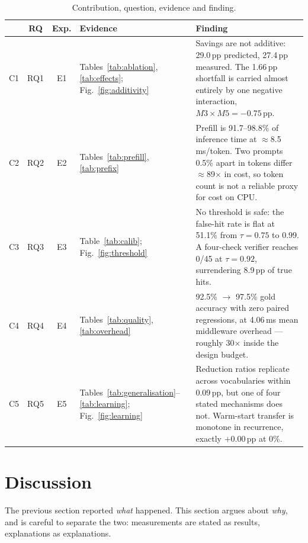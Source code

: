 \documentclass[11pt,a4paper]{article}
\begin{document}
\begin{table}[htbp]
\centering
\caption{Contribution, question, evidence and finding.}
\label{tab:summary}
\scriptsize
\begin{tabularx}{\textwidth}{@{}l c c L{2.6cm} X@{}}
\toprule
& \textbf{RQ} & \textbf{Exp.} & \textbf{Evidence} & \textbf{Finding} \\
\midrule
C1 & RQ1 & E1 & Tables~\ref{tab:ablation}, \ref{tab:effects}; Fig.~\ref{fig:additivity} &
  Savings are not additive: 29.0\,pp predicted, 27.4\,pp measured. The 1.66\,pp shortfall is carried almost entirely by one negative interaction, $M3\times M5 = -0.75$\,pp. \\
\addlinespace
C2 & RQ2 & E2 & Tables~\ref{tab:prefill}, \ref{tab:prefix} &
  Prefill is 91.7--98.8\% of inference time at $\approx$8.5\,ms/token. Two prompts 0.5\% apart in tokens differ $\approx$89$\times$ in cost, so token count is not a reliable proxy for cost on CPU. \\
\addlinespace
C3 & RQ3 & E3 & Table~\ref{tab:calib}; Fig.~\ref{fig:threshold} &
  No threshold is safe: the false-hit rate is flat at 51.1\% from $\tau=0.75$ to $0.99$. A four-check verifier reaches 0/45 at $\tau=0.92$, surrendering 8.9\,pp of true hits. \\
\addlinespace
C4 & RQ4 & E4 & Tables~\ref{tab:quality}, \ref{tab:overhead} &
  92.5\% $\rightarrow$ 97.5\% gold accuracy with zero paired regressions, at 4.06\,ms mean middleware overhead --- roughly 30$\times$ inside the design budget. \\
\addlinespace
C5 & RQ5 & E5 & Tables~\ref{tab:generalisation}--\ref{tab:learning}; Fig.~\ref{fig:learning} &
  Reduction ratios replicate across vocabularies within 0.09\,pp, but one of four stated mechanisms does not. Warm-start transfer is monotone in recurrence, exactly $+0.00$\,pp at 0\%. \\
\bottomrule
\end{tabularx}
\end{table}

\section{Discussion}
\label{sec:discussion}

The previous section reported \emph{what} happened. This section argues about
\emph{why}, and is careful to separate the two: measurements are stated as
results, explanations as explanations.
\end{document}
